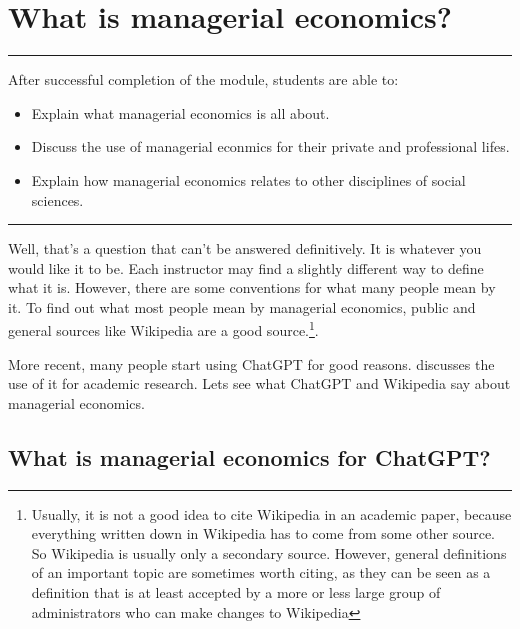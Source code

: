 \documentclass[
  12pt,
  oneside]{book}
\providecommand{\tightlist}{%
  \setlength{\itemsep}{0pt}\setlength{\parskip}{0pt}}
\theoremstyle{definition}
\theoremstyle{definition}
\theoremstyle{definition}
\theoremstyle{definition}
\theoremstyle{remark}
\begin{document}
\hypertarget{what-is-managerial-economics}{%
\chapter{What is managerial economics?}\label{what-is-managerial-economics}}

\begin{center}\rule{0.5\linewidth}{0.5pt}\end{center}

After successful completion of the module, students are able to:

\begin{itemize}
\tightlist
\item
  Explain what managerial economics is all about.
\item
  Discuss the use of managerial econmics for their private and professional lifes.
\item
  Explain how managerial economics relates to other disciplines of social sciences.
\end{itemize}

\begin{center}\rule{0.5\linewidth}{0.5pt}\end{center}

Well, that's a question that can't be answered definitively. It is whatever you would like it to be. Each instructor may find a slightly different way to define what it is. However, there are some conventions for what many people mean by it. To find out what most people mean by managerial economics, public and general sources like Wikipedia are a good source.\footnote{Usually, it is not a good idea to cite Wikipedia in an academic paper, because everything written down in Wikipedia has to come from some other source. So Wikipedia is usually only a secondary source. However, general definitions of an important topic are sometimes worth citing, as they can be seen as a definition that is at least accepted by a more or less large group of administrators who can make changes to Wikipedia}.

More recent, many people start using ChatGPT for good reasons. \citet{Korinek2023Language} discusses the use of it for academic research. Lets see what ChatGPT and Wikipedia say about managerial economics.

\hypertarget{what-is-managerial-economics-for-chatgpt}{%
\section{What is managerial economics for ChatGPT?}\label{what-is-managerial-economics-for-chatgpt}}
\end{document}
